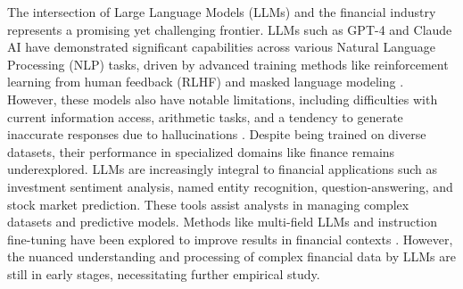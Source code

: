\documentclass[logo,msc]{infthesis}           %
\begin{document}
The intersection of Large Language Models (LLMs) and the financial industry represents a promising yet challenging frontier. LLMs such as GPT-4 and Claude AI have demonstrated significant capabilities across various Natural Language Processing (NLP) tasks, driven by advanced training methods like reinforcement learning from human feedback (RLHF) and masked language modeling \cite{li2023chatgpt}. However, these models also have notable limitations, including difficulties with current information access, arithmetic tasks, and a tendency to generate inaccurate responses due to hallucinations \cite{schick2023toolformer,li2024dawn}. Despite being trained on diverse datasets, their performance in specialized domains like finance remains underexplored.
LLMs are increasingly integral to financial applications such as investment sentiment analysis, named entity recognition, question-answering, and stock market prediction. These tools assist analysts in managing complex datasets and predictive models. Methods like multi-field LLMs and instruction fine-tuning have been explored to improve results in financial contexts \cite{lee2024survey}. However, the nuanced understanding and processing of complex financial data by LLMs are still in early stages, necessitating further empirical study.
\end{document}
